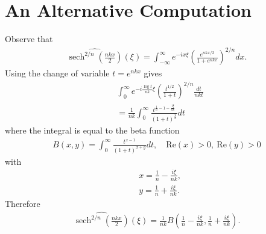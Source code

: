 \documentclass[12pt,reqno]{amsart}
\numberwithin{equation}{section}  %
\newcommand{\wh}{\widehat}
\DeclareMathOperator{\sech}{sech}
\begin{document}
        \section{An Alternative Computation} 
        Observe that
        \begin{equation*}
        \begin{split}
          \wh{\sech^{2/n}\left( \frac{nkx}{2} \right)}(\xi) =
          \int_{-\infty}^{\infty}e^{-ix\xi}\left( \frac{e^{nkx/2}}{1 +
          e^{nkx}} \right)^{2/n} dx.
        \end{split}
        \end{equation*}
        Using the change of variable $t = e^{nkx}$ gives
        \begin{equation*}
        \begin{split}
          & \int_{0}^{\infty} e^{-i \frac{\log t}{nk} \xi} \left(
          \frac{t^{1/2}}{1 + t} \right)^{2/n} \frac{dt}{nkt}
          \\
          & = \frac{1}{nk} \int_{0}^{\infty} \frac{t^{\frac{1}{n} -1 -\frac{i
          \xi}{nk}}}{(1 + t)^{\frac{2}{n}}} dt
        \end{split}
        \end{equation*}
       where the integral is equal to the beta function
       \begin{equation*}
       \begin{split}
         B(x,y) = \int_{0}^{\infty} \frac{t^{x-1}}{(1 + t)^{x+y}} dt, \quad
         \text{Re}(x) >0, \ \text{Re}(y) > 0
       \end{split}
       \end{equation*}
       with 
       \begin{equation*}
       \begin{split}
       & x = \frac{1}{n} - \frac{i \xi}{nk}, 
       \\
       & y = \frac{1}{n} + \frac{i \xi}{nk}.
       \end{split}
       \end{equation*}
       Therefore
       \begin{equation*}
       \begin{split}
       \wh{\sech^{2/n}\left( \frac{nkx}{2} \right)}(\xi) =
       \frac{1}{nk} B\left( \frac{1}{n} - \frac{i \xi}{nk}, \frac{1}{n} + \frac{i \xi}{nk}
       \right).
       \end{split}
       \end{equation*}
\end{document}
